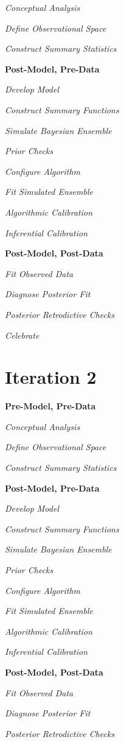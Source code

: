 \documentclass[11pt, oneside, openany]{scrbook}
\begin{document}
\emph{Conceptual Analysis}

\emph{Define Observational Space}

\emph{Construct Summary Statistics}

\textbf{Post-Model, Pre-Data}

\emph{Develop Model}

\emph{Construct Summary Functions}

\emph{Simulate Bayesian Ensemble}

\emph{Prior Checks}

\emph{Configure Algorithm}

\emph{Fit Simulated Ensemble}

\emph{Algorithmic Calibration}

\emph{Inferential Calibration}

\textbf{Post-Model, Post-Data}

\emph{Fit Observed Data}

\emph{Diagnose Posterior Fit}

\emph{Posterior Retrodictive Checks}

\emph{Celebrate}

\hypertarget{iter2}{%
\section{Iteration 2}\label{iter2}}

\textbf{Pre-Model, Pre-Data}

\emph{Conceptual Analysis}

\emph{Define Observational Space}

\emph{Construct Summary Statistics}

\textbf{Post-Model, Pre-Data}

\emph{Develop Model}

\emph{Construct Summary Functions}

\emph{Simulate Bayesian Ensemble}

\emph{Prior Checks}

\emph{Configure Algorithm}

\emph{Fit Simulated Ensemble}

\emph{Algorithmic Calibration}

\emph{Inferential Calibration}

\textbf{Post-Model, Post-Data}

\emph{Fit Observed Data}

\emph{Diagnose Posterior Fit}

\emph{Posterior Retrodictive Checks}
\end{document}
